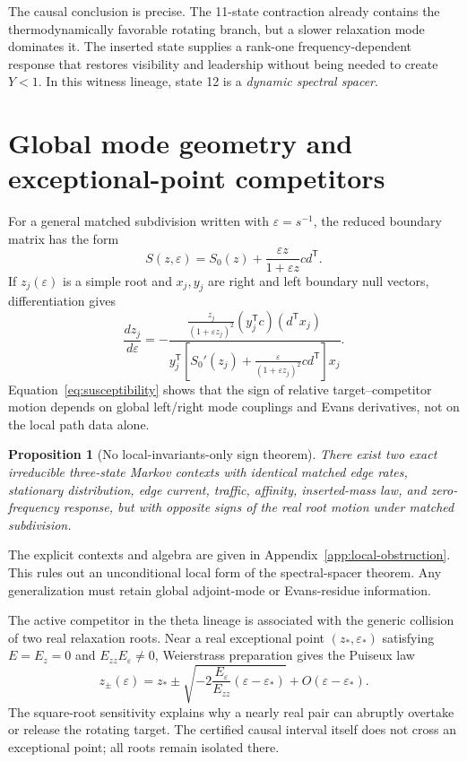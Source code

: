 \documentclass[aps,pre,reprint,groupedaddress,nofootinbib,showkeys,floatfix]{revtex4-2}
\newtheorem{proposition}{Proposition}
\begin{document}
The causal conclusion is precise. The 11-state contraction already contains the thermodynamically favorable rotating branch, but a slower relaxation mode dominates it. The inserted state supplies a rank-one frequency-dependent response that restores visibility and leadership without being needed to create $Y<1$. In this witness lineage, state 12 is a \emph{dynamic spectral spacer}.

\section{Global mode geometry and exceptional-point competitors}
For a general matched subdivision written with $\varepsilon=s^{-1}$, the reduced boundary matrix has the form
\begin{equation}
S(z,\varepsilon)=S_0(z)+\frac{\varepsilon z}{1+\varepsilon z}cd^{\mathsf T}.
\end{equation}
If $z_j(\varepsilon)$ is a simple root and $x_j,y_j$ are right and left boundary null vectors, differentiation gives
\begin{equation}
\frac{dz_j}{d\varepsilon}
=-\frac{\frac{z_j}{(1+\varepsilon z_j)^2}(y_j^{\mathsf T}c)(d^{\mathsf T}x_j)}
{y_j^{\mathsf T}\left[S_0'(z_j)+\frac{\varepsilon}{(1+\varepsilon z_j)^2}cd^{\mathsf T}\right]x_j}.
\label{eq:susceptibility}
\end{equation}
Equation~\eqref{eq:susceptibility} shows that the sign of relative target--competitor motion depends on global left/right mode couplings and Evans derivatives, not on the local path data alone.

\begin{proposition}[No local-invariants-only sign theorem]
There exist two exact irreducible three-state Markov contexts with identical matched edge rates, stationary distribution, edge current, traffic, affinity, inserted-mass law, and zero-frequency response, but with opposite signs of the real root motion under matched subdivision.
\end{proposition}
The explicit contexts and algebra are given in Appendix~\ref{app:local-obstruction}. This rules out an unconditional local form of the spectral-spacer theorem. Any generalization must retain global adjoint-mode or Evans-residue information.

The active competitor in the theta lineage is associated with the generic collision of two real relaxation roots. Near a real exceptional point $(z_*,\varepsilon_*)$ satisfying $E=E_z=0$ and $E_{zz}E_\varepsilon\ne0$, Weierstrass preparation gives the Puiseux law \cite{Kato1995}
\begin{equation}
z_\pm(\varepsilon)=z_*\pm
\sqrt{-2\frac{E_\varepsilon}{E_{zz}}(\varepsilon-\varepsilon_*)}
+O(\varepsilon-\varepsilon_*).
\end{equation}
The square-root sensitivity explains why a nearly real pair can abruptly overtake or release the rotating target. The certified causal interval itself does not cross an exceptional point; all roots remain isolated there.
\end{document}
